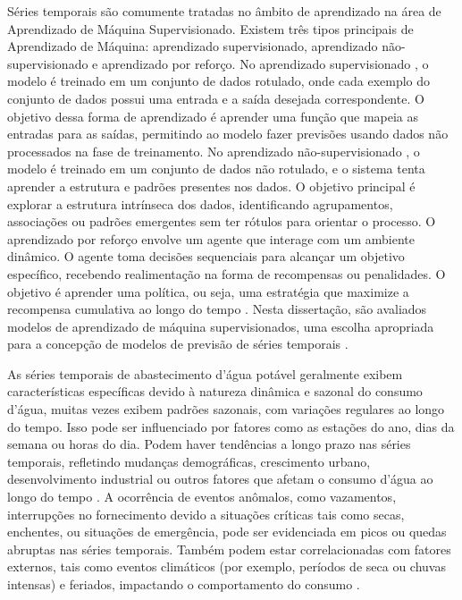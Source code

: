 Séries temporais são comumente tratadas no âmbito de aprendizado na área de Aprendizado de Máquina Supervisionado. Existem três tipos principais de Aprendizado de Máquina: aprendizado supervisionado, aprendizado não-supervisionado e aprendizado por reforço. No aprendizado supervisionado \cite{LIU2023128730}, o modelo é treinado em um conjunto de dados rotulado, onde cada exemplo do conjunto de dados possui uma entrada e a saída desejada correspondente. O objetivo dessa forma de aprendizado é aprender uma função que mapeia as entradas para as saídas, permitindo ao modelo fazer previsões usando dados não processados na fase de treinamento. No aprendizado não-supervisionado \cite{WANG2022122747}, o modelo é treinado em um conjunto de dados não rotulado, e o sistema tenta aprender a estrutura e padrões presentes nos dados. O objetivo principal é explorar a estrutura intrínseca dos dados, identificando agrupamentos, associações ou padrões emergentes sem ter rótulos para orientar o processo. O aprendizado por reforço \cite{CHEN2023121710} envolve um agente que interage com um ambiente dinâmico. O agente toma decisões sequenciais para alcançar um objetivo específico, recebendo realimentação na forma de recompensas ou penalidades. O objetivo é aprender uma política, ou seja, uma estratégia que maximize a recompensa cumulativa ao longo do tempo \cite{Silva2021}. Nesta dissertação, são avaliados modelos de aprendizado de máquina supervisionados, uma escolha apropriada para a concepção de modelos de previsão de séries temporais \cite{UCCASTILLO2023105788}.


As séries temporais de abastecimento d'água potável geralmente exibem características específicas devido à natureza dinâmica e sazonal do consumo d'água, muitas vezes exibem padrões sazonais, com variações regulares ao longo do tempo. Isso pode ser influenciado por fatores como as estações do ano, dias da semana ou horas do dia. Podem haver tendências a longo prazo nas séries temporais, refletindo mudanças demográficas, crescimento urbano, desenvolvimento industrial ou outros fatores que afetam o consumo d'água ao longo do tempo \cite{JI2023129928}. A ocorrência de eventos anômalos, como vazamentos, interrupções no fornecimento devido a situações críticas tais como secas, enchentes, ou situações de emergência, pode ser evidenciada em picos ou quedas abruptas nas séries temporais. Também podem estar correlacionadas com fatores externos, tais como eventos climáticos (por exemplo, períodos de seca ou chuvas intensas) e feriados, impactando o comportamento do consumo \cite{BERGLUND2023104739}.

